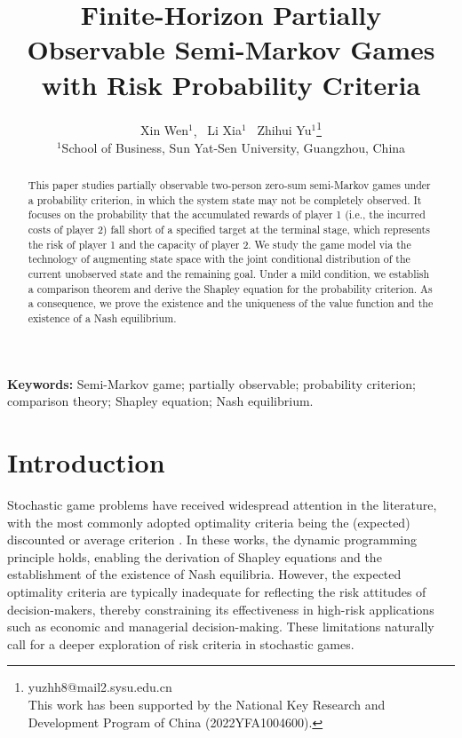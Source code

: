 \documentclass[12pt]{article}
\begin{document}
	
\title{\vspace{-2.6cm}
	Finite-Horizon Partially Observable Semi-Markov Games
	with  Risk Probability Criteria}
\author{{Xin Wen$^1$}, \ {Li Xia$^1$} \ {Zhihui Yu$^1$\thanks {yuzhh8@mail2.sysu.edu.cn\\This work has been supported by the National Key Research and Development Program of China (2022YFA1004600).}}  \\
	\small \vspace{-0.4cm}
	{$^1$School of Business, Sun Yat-Sen University, Guangzhou, China}\\
}
\date{}
\maketitle



\begin{abstract}
This paper studies partially observable two-person zero-sum semi-Markov games under a probability criterion, in which the 
system state may not be completely observed. 
It focuses on the probability that the accumulated rewards of player 1 (i.e., the incurred costs of player 2)  fall short of a specified target at the terminal stage, which represents the risk of player 1  and the capacity of player 2.
We study the game model via the technology of augmenting state space with the joint conditional distribution of the current unobserved state and the remaining  goal.
Under a mild condition, we establish a comparison theorem and derive the Shapley equation for the probability criterion. As a consequence, we prove the existence and the uniqueness of the value function and the existence of a Nash equilibrium. 
\end{abstract}

\textbf{Keywords:}  Semi-Markov game; partially observable; probability criterion;  comparison theory; Shapley equation; Nash equilibrium.

\section{Introduction}\label{sec1}
Stochastic game problems have received widespread attention in the literature, with the most commonly adopted optimality criteria being the (expected) discounted or average criterion \citep{shapley1953stochastic, sobel1971noncooperative, neyman2017continuous, babu2017stationary, chakrabarti2025stationary}. In these works, the dynamic programming principle holds, enabling the derivation of Shapley equations and the establishment of the existence of Nash equilibria. 
However, the expected optimality criteria are typically inadequate for reflecting the risk attitudes of decision-makers, thereby constraining its effectiveness in high-risk applications such as economic and managerial decision-making.
These limitations naturally call for a deeper exploration of risk criteria in stochastic games.
\end{document}
